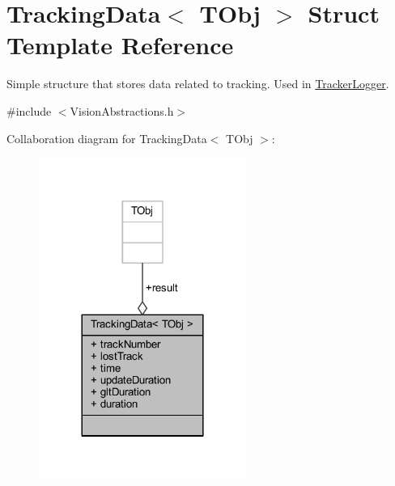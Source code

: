 \hypertarget{struct_vision_core_1_1_abstractions_1_1_tracking_data}{}\section{Tracking\+Data$<$ T\+Obj $>$ Struct Template Reference}
\label{struct_vision_core_1_1_abstractions_1_1_tracking_data}


Simple structure that stores data related to tracking. Used in \hyperlink{class_vision_core_1_1_abstractions_1_1_tracker_logger}{Tracker\+Logger}.  




{\ttfamily \#include $<$Vision\+Abstractions.\+h$>$}



Collaboration diagram for Tracking\+Data$<$ T\+Obj $>$\+:
\nopagebreak
\begin{figure}[H]
\begin{center}
\leavevmode
\includegraphics[width=192pt]{struct_vision_core_1_1_abstractions_1_1_tracking_data__coll__graph}
\end{center}
\end{figure}
